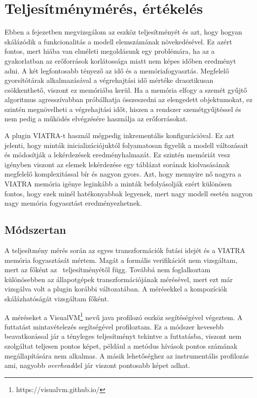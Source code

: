 \chapter{Teljesítménymérés, értékelés}

Ebben a fejezetben megvizsgálom az eszköz teljesítményét és azt, hogy hogyan skálázódik a funkcionalitás a modell elemszámának növekedésével. Ez azért fontos, mert  hiába van elméleti megoldásunk egy problémára, ha az a gyakorlatban az erőforrások korlátossága miatt nem képes időben eredményt adni. A két legfontosabb tényező az idő és a memóriafogyasztás. Megfelelő gyorsítótárak alkalmazásával a végrehajtási idő mértéke drasztikusan csökkenthető, viszont ez memóriába kerül. Ha a memória elfogy a szemét gyűjtő algoritmus agresszívabban próbálhatja összeszedni az elengedett objektumokat, ez szintén megnövelheti a végrehajtási időt, hiszen a rendszer szemétgyűjtéssel és nem pedig a működés elvégzésére használja az erőforrásokat.

A plugin VIATRA-t használ mégpedig inkrementális konfigurációval. Ez azt jelenti, hogy minták inicializációjuktól folyamatosan figyelik a modell változásait és módosítják a lekérdezések eredményhalmazát. Ez szintén memóriát vesz igényben viszont az elemek lekérdezése egy táblázat sorának kiolvasásának megfelelő komplexitással bír és nagyon gyors. Azt, hogy mennyire nő nagyra a VIATRA memória igénye leginkább a minták befolyásolják ezért különösen fontos, hogy ezek minél hatékonyabbak legyenek, mert nagy modell esetén nagyon nagy memória fogyasztást eredményezhetnek.

\section{Módszertan}

A teljesítmény mérés során az egyes transzformációk futási idejét és a VIATRA memória fogyasztását mértem. Magát a formális verifikációt  nem vizsgáltam, mert az főként az \uppaal\ teljesítményétől függ. Továbbá nem foglalkoztam különösebben az állapotgépek transzformációjának mérésével, mert ezt már vizsgálva volt a plugin korábbi változatában. A mérésekkel a kompozíciók skálázhatóságát vizsgáltam főként.

A méréseket a VisualVM\footnote{https://visualvm.github.io/} nevű java profilozó eszköz segítéségével végeztem. A futtatást mintavételezés segítségével profiloztam. Ez a módszer kevesebb beavatkozással jár a tényleges teljesítményt tekintve a futtatásba, viszont nem szolgáltat teljesen pontos képet, például a metódus hívások pontos számának megállapítására nem alkalmas. A másik lehetőséghez az instrumentális profilozás ami, nagyobb \emph{overhead}del jár viszont pontosabb képet adhat.

